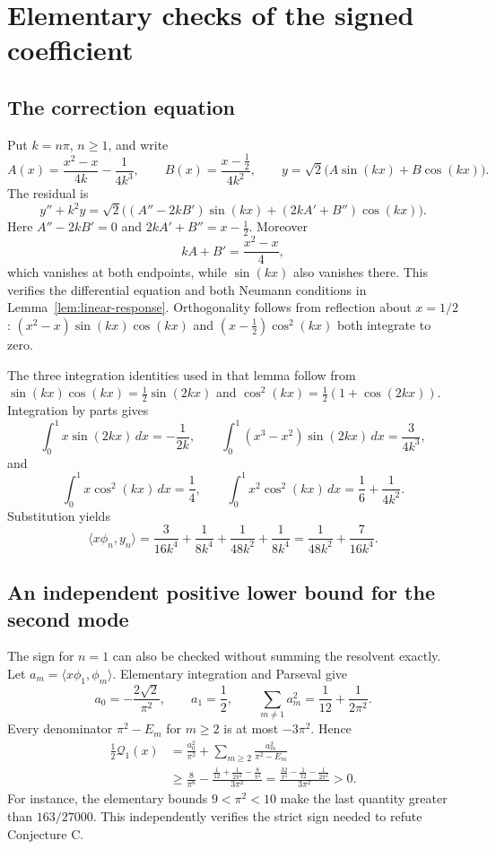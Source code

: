 \documentclass[11pt,a4paper]{article}
\theoremstyle{definition}\newtheorem{definition}[theorem]{Definition}
\theoremstyle{remark}\newtheorem{remark}[theorem]{Remark}
\begin{document}
\section{Elementary checks of the signed coefficient}\label{app:checks}

\subsection{The correction equation}
Put $k=n\pi$, $n\geq1$, and write
\[
 A(x)=\frac{x^2-x}{4k}-\frac1{4k^3},\qquad
 B(x)=\frac{x-\tfrac12}{4k^2},\qquad
 y=\sqrt2\bigl(A\sin(kx)+B\cos(kx)\bigr).
\]
The residual is
\[
 y''+k^2y
 =\sqrt2\bigl((A''-2kB')\sin(kx)
                 +(2kA'+B'')\cos(kx)\bigr).
\]
Here $A''-2kB'=0$ and $2kA'+B''=x-\tfrac12$.
Moreover
\[
 kA+B'=\frac{x^2-x}{4},
\]
which vanishes at both endpoints, while $\sin(kx)$ also
vanishes there. This verifies the differential equation and
both Neumann conditions in Lemma~\ref{lem:linear-response}.
Orthogonality follows from reflection about $x=1/2$:
$(x^2-x)\sin(kx)\cos(kx)$ and
$(x-\tfrac12)\cos^2(kx)$ both integrate to zero.

The three integration identities used in that lemma follow
from $\sin(kx)\cos(kx)=\tfrac12\sin(2kx)$ and
$\cos^2(kx)=\tfrac12(1+\cos(2kx))$. Integration by parts gives
\[
 \int_0^1x\sin(2kx)\,dx=-\frac1{2k},\qquad
 \int_0^1(x^3-x^2)\sin(2kx)\,dx=\frac3{4k^3},
\]
and
\[
 \int_0^1x\cos^2(kx)\,dx=\frac14,\qquad
 \int_0^1x^2\cos^2(kx)\,dx=\frac16+\frac1{4k^2}.
\]
Substitution yields
\[
 \langle x\phi_n,y_n\rangle
 =\frac{3}{16k^4}+\frac{1}{8k^4}
       +\frac{1}{48k^2}+\frac{1}{8k^4}
 =\frac1{48k^2}+\frac7{16k^4}.
\]

\subsection{An independent positive lower bound for the second mode}
The sign for $n=1$ can also be checked without summing the
resolvent exactly. Let
$a_m=\langle x\phi_1,\phi_m\rangle$. Elementary integration and
Parseval give
\[
 a_0=-\frac{2\sqrt2}{\pi^2},\qquad a_1=\frac12,\qquad
 \sum_{m\ne1}a_m^2=\frac1{12}+\frac1{2\pi^2}.
\]
Every denominator $\pi^2-E_m$ for $m\geq2$ is at most
$-3\pi^2$. Hence
\begin{align*}
 \frac12\mathcal Q_1(x)
 &=\frac{a_0^2}{\pi^2}
       +\sum_{m\geq2}\frac{a_m^2}{\pi^2-E_m}\\
 &\geq\frac{8}{\pi^6}
   -\frac{\tfrac1{12}+\tfrac1{2\pi^2}-\tfrac8{\pi^4}}
          {3\pi^2}
 =\frac{\tfrac{32}{\pi^4}-\tfrac1{12}-\tfrac1{2\pi^2}}
          {3\pi^2}>0.
\end{align*}
For instance, the elementary bounds $9<\pi^2<10$ make the last
quantity greater than $163/27000$. This independently verifies
the strict sign needed to refute Conjecture C.
\end{document}
